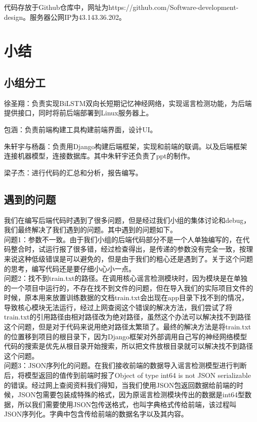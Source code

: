 \documentclass{article}
\begin{document}
代码存放于Github仓库中，网址为https://github.com/Software-development-design。服务器公网IP为43.143.36.202。

\newpage

\section{小结}
\subsection{小组分工}
徐圣翔：负责实现BiLSTM双向长短期记忆神经网络，实现谣言检测功能，为后端提供接口，同时将前后端部署到Linux服务器上。

包涵：负责前端构建工具构建前端界面，设计UI。

朱轩宇与杨磊：负责用Django构建后端框架，实现和前端的联调。以及后端框架连接机器模型，连接数据库。其中朱轩宇还负责了ppt的制作。

梁子杰：进行代码的汇总和分析，报告编写。

\subsection{遇到的问题}
我们在编写后端代码时遇到了很多问题，但是经过我们小组的集体讨论和debug，我们最终解决了我们遇到的问题。其中遇到的问题如下。
\\

问题1：参数不一致。由于我们小组的后端代码部分不是一个人单独编写的，在代码整合时，试运行报了很多错，经过检查得出，是传递的参数没有完全一致，按理来说这种低级错误是可以避免的，但是由于我们的粗心还是遇到了。关于这个问题的思考，编写代码还是要仔细小心小一点。
\\

问题2：找不到train.txt的路径。在调用核心谣言检测模块时，因为模块是在单独的一个项目中运行的，不存在找不到文件的问题，但在导入我们的实际项目文件的时候，原本用来放置训练数据的文档train.txt会出现在app目录下找不到的情况，导致核心模块无法运行，经过上网查阅这个错误的解决方法，我们尝试了将train.txt的引用路径由相对路径改为绝对路径，虽然这个办法可以解决找不到路径这个问题，但是对于代码来说用绝对路径太繁琐了。最终的解决方法是将train.txt的位置移到项目的根目录下，因为Django框架对外部调用自己写的神经网络模型代码的搜索是优先从根目录开始搜索，所以把文件放根目录就可以解决找不到路径这个问题。
\\

问题3：JSON序列化的问题。在我们接收前端的数据导入谣言检测模型进行判断后，将模型返回的值传到前端时报了Object of type int64 is not JSON serializable的错误。经过网上查阅资料我们得知，当我们使用JSON包返回数据给前端的时候，JSON包需要包装成特殊的格式，因为原谣言检测模块传出的数据是int64型数据，所以我们需要使用JSON包传送格式，也叫字典格式传给前端，该过程叫JSON序列化。字典中包含传给前端的数据名字以及其内容。
\\
\end{document}
